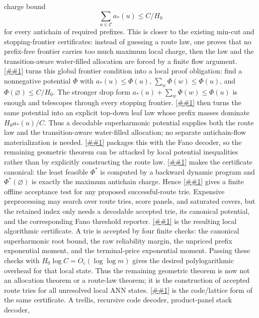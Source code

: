 \documentclass[10pt]{article}
\newcommand{\cref}[1]{\ref{##1}}
\newcommand{\Cref}[1]{\ref{##1}}
\theoremstyle{definition}
\begin{document}
charge bound
\[
   \sum_{u\in\mathcal C}a_*(u)\le C/H_0
\]
for every antichain of required prefixes.  This is closer to the existing
min-cut and stopping-frontier certificates: instead of guessing a route law,
one proves that no prefix-free frontier carries too much maximum local charge,
then the law and the transition-aware water-filled allocation are forced by a
finite flow argument.
\Cref{lem:local-antichain-charge-potential} turns this global frontier
condition into a local proof obligation: find a nonnegative potential
\(\Phi\) with \(a_*(u)\le\Phi(u)\),
\(\sum_w\Phi(w)\le\Phi(u)\), and
\(\Phi(\varnothing)\le C/H_0\).  The stronger drop form
\(a_*(u)+\sum_w\Phi(w)\le\Phi(u)\) is enough and telescopes through every
stopping frontier.  \Cref{lem:superharmonic-potential-route-law} then turns
the same potential into an explicit top-down leaf law whose prefix masses
dominate \(H_0a_*(u)/C\).  Thus a decodable superharmonic potential supplies
both the route law and the transition-aware water-filled allocation; no
separate antichain-flow materialization is needed.  \Cref{cor:local-potential-antichain-fano}
packages this with the Fano decoder, so the remaining geometric theorem can be
attacked by local potential inequalities rather than by explicitly
constructing the route law.
\Cref{lem:least-superharmonic-majorant} makes the certificate canonical: the
least feasible \(\Phi^*\) is computed by a backward dynamic program and
\(\Phi^*(\varnothing)\) is exactly the maximum antichain charge.  Hence
\cref{cor:offline-superharmonic-route-verifier} gives a finite offline
acceptance test for any proposed successful-route trie.  Expensive
preprocessing may search over route tries, score panels, and saturated covers,
but the retained index only needs a decodable accepted trie, its canonical
potential, and the corresponding Fano threshold reporter.
\Cref{cor:finite-accepted-route-trie-compiler} is the resulting local
algorithmic certificate.  A trie is accepted by four finite checks: the
canonical superharmonic root bound, the raw reliability margin, the unpriced
prefix exponential moment, and the terminal-price exponential moment.  Passing
these checks with \(H_0\log C=O_c(\log\log m)\) gives the desired polylogarithmic
overhead for that local state.  Thus the remaining geometric theorem is now
not an allocation theorem or a route-law theorem; it is the construction of
accepted route tries for all unresolved local ANN states.
\Cref{cor:compressed-route-dag-verifier} is the code/lattice form of the same
certificate.  A trellis, recursive code decoder, product-panel stack decoder,
\end{document}
